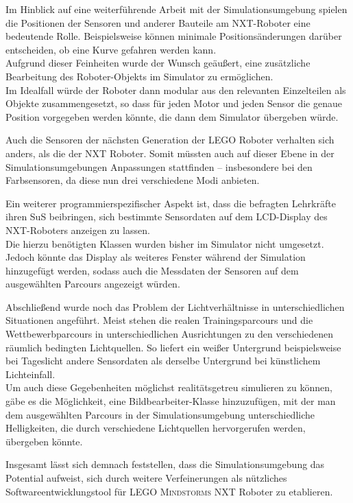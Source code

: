 \documentclass[paper=a4, DIV=calc, BCOR=15mm, twoside=on, onecolumn=on, open = right, titlepage =on, parskip =half, headsepline = on, footsepline = on, chapterprefix = off, appendixprefix = off, fontsize = 12pt, numbers = noenddot, abstract = on]{scrbook}
\begin{document}
Im Hinblick auf eine weiterführende Arbeit mit der Simulationsumgebung spielen die Positionen der Sensoren und anderer Bauteile am NXT-Roboter eine bedeutende Rolle. Beispielsweise können minimale Positionsänderungen darüber entscheiden, ob eine Kurve gefahren werden kann.\\
Aufgrund dieser Feinheiten wurde der Wunsch geäußert, eine zusätzliche Bearbeitung des Roboter-Objekts im Simulator zu ermöglichen.\\
Im Idealfall würde der Roboter dann modular aus den relevanten Einzelteilen als Objekte zusammengesetzt, so dass für jeden Motor und jeden Sensor die genaue Position vorgegeben werden könnte, die dann dem Simulator übergeben würde.

Auch die Sensoren der nächsten Generation der \textsc{LEGO} Roboter verhalten sich anders, als die der NXT Roboter. Somit müssten auch auf dieser Ebene in der Simulationsumgebungen Anpassungen stattfinden -- insbesondere bei den Farbsensoren, da diese nun drei verschiedene Modi anbieten.

Ein weiterer programmierspezifischer Aspekt ist, dass die befragten Lehrkräfte ihren SuS beibringen, sich bestimmte Sensordaten auf dem LCD-Display des NXT-Roboters anzeigen zu lassen.\\
Die hierzu benötigten Klassen wurden bisher im Simulator nicht umgesetzt. Jedoch könnte das Display als weiteres Fenster während der Simulation hinzugefügt werden, sodass auch die Messdaten der Sensoren auf dem ausgewählten Parcours angezeigt würden. 

Abschließend wurde noch das Problem der Lichtverhältnisse in unterschiedlichen Situationen angeführt. Meist stehen die realen Trainingsparcours und die Wettbewerbparcours in unterschiedlichen Ausrichtungen zu den verschiedenen räumlich bedingten Lichtquellen. So liefert ein weißer Untergrund beispielsweise bei Tageslicht andere Sensordaten als derselbe Untergrund bei künstlichem Lichteinfall.\\
Um auch diese Gegebenheiten möglichst realitätsgetreu simulieren zu können, gäbe es die Möglichkeit, eine Bildbearbeiter-Klasse hinzuzufügen, mit der man dem ausgewählten Parcours in der Simulationsumgebung unterschiedliche Helligkeiten, die durch verschiedene Lichtquellen hervorgerufen werden, übergeben könnte.

Insgesamt lässt sich demnach feststellen, dass die Simulationsumgebung das Potential aufweist, sich durch weitere Verfeinerungen als nützliches Softwareentwicklungstool für \textsc{LEGO Mindstorms} NXT Roboter zu etablieren.
\end{document}
